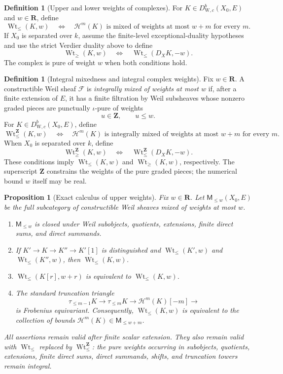 \documentclass[10pt]{article}
\newtheorem{proposition}[theorem]{Proposition}
\theoremstyle{definition}
\newtheorem{definition}[theorem]{Definition}
\newcommand{\DW}{D^b_{\mathrm W,c}}
\newcommand{\WtLe}{\operatorname{Wt}_{\leq}}
\newcommand{\WtGe}{\operatorname{Wt}_{\geq}}
\newcommand{\IntWtLe}{\operatorname{Wt}^{\mathbf Z}_{\leq}}
\newcommand{\IntWtGe}{\operatorname{Wt}^{\mathbf Z}_{\geq}}
\begin{document}
\begin{definition}[Upper and lower weights of complexes]
For \(K\in\DW(X_0,E)\) and \(w\in\mathbf R\), define
\[
 \WtLe(K,w)
 \quad\Longleftrightarrow\quad
 \mathcal H^m(K)\text{ is mixed of weights at most }w+m
 \text{ for every }m.
\]
If \(X_0\) is separated over \(k\), assume the finite-level
exceptional-duality hypotheses and use the strict Verdier duality above to
define
\[
                 \WtGe(K,w)\quad\Longleftrightarrow\quad
                 \WtLe(D_XK,-w).
\]
The complex is pure of weight \(w\) when both conditions hold.
\end{definition}

\begin{definition}[Integral mixedness and integral complex weights]
Fix \(w\in\mathbf R\).  A constructible Weil sheaf \(\mathcal F\) is
\emph{integrally mixed of
weights at most \(w\)} if, after a finite extension of \(E\), it has a
finite filtration by Weil subsheaves whose nonzero graded pieces are
punctually \(\iota\)-pure of weights
\[
                              u\in\mathbf Z,\qquad u\leq w.
\]
For \(K\in\DW(X_0,E)\), define
\[
 \IntWtLe(K,w)
 \quad\Longleftrightarrow\quad
 \mathcal H^m(K)\text{ is integrally mixed of weights at most }w+m
 \text{ for every }m.
\]
When \(X_0\) is separated over \(k\), define
\[
                 \IntWtGe(K,w)
       \quad\Longleftrightarrow\quad
                 \IntWtLe(D_XK,-w).
\]
These conditions imply \(\WtLe(K,w)\) and \(\WtGe(K,w)\), respectively.
The superscript \(\mathbf Z\) constrains the weights of the pure graded
pieces; the numerical bound \(w\) itself may be real.
\end{definition}

\begin{proposition}[Exact calculus of upper weights]
Fix \(w\in\mathbf R\).
Let \(\mathsf M_{\le w}(X_0,E)\) be the full subcategory of constructible
Weil sheaves mixed of weights at most \(w\).
\begin{enumerate}[label=\textup{(\roman*)}]
\item \(\mathsf M_{\le w}\) is closed under Weil subobjects, quotients,
extensions, finite direct sums, and direct summands.
\item If \(K'\to K\to K''\to K'[1]\) is distinguished and
\(\WtLe(K',w)\) and \(\WtLe(K'',w)\), then \(\WtLe(K,w)\).
\item \(\WtLe(K[r],w+r)\) is equivalent to \(\WtLe(K,w)\).
\item The standard truncation triangle
\[
 \tau_{\le m-1}K\longrightarrow\tau_{\le m}K
 \longrightarrow\mathcal H^m(K)[-m]\longrightarrow
\]
is Frobenius equivariant.  Consequently, \(\WtLe(K,w)\) is equivalent to
the collection of bounds
\(\mathcal H^m(K)\in\mathsf M_{\le w+m}\).
\end{enumerate}
All assertions remain valid after finite scalar extension.
They also remain valid with \(\WtLe\) replaced by \(\IntWtLe\): the pure
weights occurring in subobjects, quotients, extensions, finite direct
sums, direct summands, shifts, and truncation towers remain integral.
\end{proposition}
\end{document}
